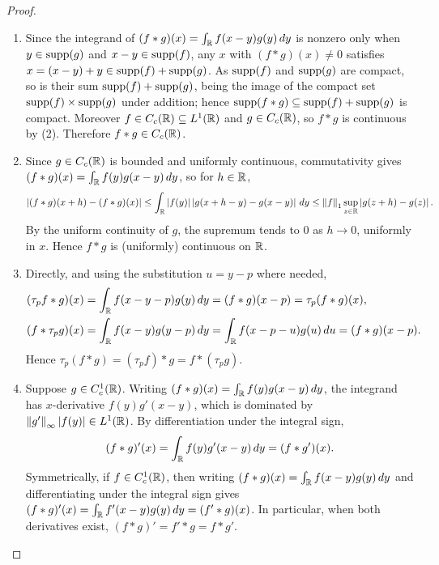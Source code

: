 \begin{proof}
    \begin{enumerate}
        \item Since the integrand of $(f \ast g)(x) = \int_{\mathbb{R}} f(x-y)g(y) \, dy$ is nonzero only when $y \in \operatorname{supp}(g)$ and $x-y \in \operatorname{supp}(f)$, any $x$ with $(f \ast g)(x) \neq 0$ satisfies $x = (x-y)+y \in \operatorname{supp}(f) + \operatorname{supp}(g)$. As $\operatorname{supp}(f)$ and $\operatorname{supp}(g)$ are compact, so is their sum $\operatorname{supp}(f) + \operatorname{supp}(g)$, being the image of the compact set $\operatorname{supp}(f) \times \operatorname{supp}(g)$ under addition; hence $\operatorname{supp}(f \ast g) \subseteq \operatorname{supp}(f) + \operatorname{supp}(g)$ is compact. Moreover $f \in C_{c}(\mathbb{R}) \subseteq L^{1}(\mathbb{R})$ and $g \in C_{c}(\mathbb{R})$, so $f \ast g$ is continuous by (2). Therefore $f \ast g \in C_{c}(\mathbb{R})$.

        \item Since $g \in C_{c}(\mathbb{R})$ is bounded and uniformly continuous, commutativity gives $(f \ast g)(x) = \int_{\mathbb{R}} f(y)g(x-y) \, dy$, so for $h \in \mathbb{R}$,
        \begin{align}
            \left| (f \ast g)(x+h)-(f \ast g)(x) \right| \leq \int_{\mathbb{R}} \left| f(y) \right| \left| g(x+h-y)-g(x-y) \right| \, dy \leq \left\lVert f\right\rVert_{1} \sup_{z \in \mathbb{R}} \left| g(z+h)-g(z) \right|.
        \end{align}
        By the uniform continuity of $g$, the supremum tends to $0$ as $h \to 0$, uniformly in $x$. Hence $f \ast g$ is (uniformly) continuous on $\mathbb{R}$.

        \item Directly, and using the substitution $u = y-p$ where needed,
        \begin{align}
            (\tau_{p}f \ast g)(x) &= \int_{\mathbb{R}} f(x-y-p)g(y) \, dy = (f \ast g)(x-p) = \tau_{p}(f \ast g)(x), \\
            (f \ast \tau_{p}g)(x) &= \int_{\mathbb{R}} f(x-y)g(y-p) \, dy = \int_{\mathbb{R}} f(x-p-u)g(u) \, du = (f \ast g)(x-p).
        \end{align}
        Hence $\tau_{p}(f \ast g) = (\tau_{p}f) \ast g = f \ast (\tau_{p}g)$.

        \item Suppose $g \in C_{c}^{1}(\mathbb{R})$. Writing $(f \ast g)(x) = \int_{\mathbb{R}} f(y)g(x-y) \, dy$, the integrand has $x$-derivative $f(y)g'(x-y)$, which is dominated by $\left\lVert g'\right\rVert_{\infty}\left| f(y) \right| \in L^{1}(\mathbb{R})$. By differentiation under the integral sign,
        \begin{align}
            (f \ast g)'(x) = \int_{\mathbb{R}} f(y)g'(x-y) \, dy = (f \ast g')(x).
        \end{align}
        Symmetrically, if $f \in C_{c}^{1}(\mathbb{R})$, then writing $(f \ast g)(x) = \int_{\mathbb{R}} f(x-y)g(y) \, dy$ and differentiating under the integral sign gives $(f \ast g)'(x) = \int_{\mathbb{R}} f'(x-y)g(y) \, dy = (f' \ast g)(x)$. In particular, when both derivatives exist, $(f \ast g)' = f' \ast g = f \ast g'$.


\end{enumerate}
\end{proof}
